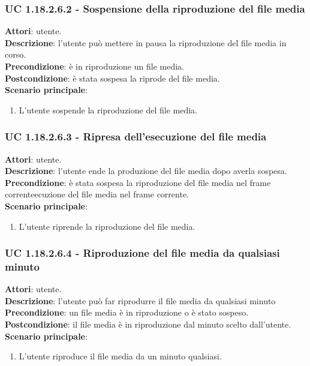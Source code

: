	\subsubsection{UC 1.18.2.6.2 - Sospensione della riproduzione del file media}{
		\label{uc1.18.2.6.2}
		\textbf{Attori}: utente. \\
		\textbf{Descrizione}: l'utente può mettere in pausa la riproduzione del file media in corso. \\
		\textbf{Precondizione}: è in riproduzione un file media.	\\
		\textbf{Postcondizione}: è stata sospesa la riprode del file media.\\
		\textbf{Scenario principale}:
		\begin{enumerate}
			\item L'utente sospende la riproduzione del file media.
		\end{enumerate}				
	}
	\subsubsection{UC 1.18.2.6.3 - Ripresa dell'esecuzione del file media}{
		\label{uc1.18.2.6.3}
		\textbf{Attori}: utente. \\
		\textbf{Descrizione}: l'utente ende la produzione del file media dopo averla sospesa. \\
		\textbf{Precondizione}: è stata sospesa la riproduzione del file media nel frame correnteecuzione del file media nel frame corrente.\\
		\textbf{Scenario principale}:
		\begin{enumerate}
			\item L'utente riprende la riproduzione del file media.
		\end{enumerate}				
	}
	\subsubsection{UC 1.18.2.6.4 - Riproduzione del file media da qualsiasi minuto}{
		\label{uc1.18.2.6.4}
		\textbf{Attori}: utente. \\
		\textbf{Descrizione}: l'utente può far riprodurre il file media da qualsiasi minuto
		\textbf{Precondizione}: un file media è in riproduzione o è stato sospeso.	\\
		\textbf{Postcondizione}: il file media è in riproduzione dal minuto scelto dall'utente.\\
		\textbf{Scenario principale}:
		\begin{enumerate}
			\item L'utente riproduce il file media da un minuto qualsiasi. 
		\end{enumerate}				
	}
